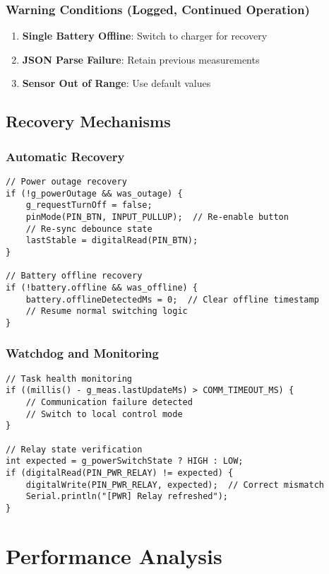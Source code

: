 \documentclass[11pt,a4paper]{article}
\begin{document}
\subsubsection{Warning Conditions (Logged, Continued Operation)}
\begin{enumerate}
    \item \textbf{Single Battery Offline}: Switch to charger for recovery
    \item \textbf{JSON Parse Failure}: Retain previous measurements
    \item \textbf{Sensor Out of Range}: Use default values
\end{enumerate}

\subsection{Recovery Mechanisms}

\subsubsection{Automatic Recovery}
\begin{lstlisting}[caption=Power Outage Recovery]
// Power outage recovery
if (!g_powerOutage && was_outage) {
    g_requestTurnOff = false;
    pinMode(PIN_BTN, INPUT_PULLUP);  // Re-enable button
    // Re-sync debounce state
    lastStable = digitalRead(PIN_BTN);
}

// Battery offline recovery
if (!battery.offline && was_offline) {
    battery.offlineDetectedMs = 0;  // Clear offline timestamp
    // Resume normal switching logic
}
\end{lstlisting}

\subsubsection{Watchdog and Monitoring}
\begin{lstlisting}[caption=Watchdog and Monitoring]
// Task health monitoring
if ((millis() - g_meas.lastUpdateMs) > COMM_TIMEOUT_MS) {
    // Communication failure detected
    // Switch to local control mode
}

// Relay state verification
int expected = g_powerSwitchState ? HIGH : LOW;
if (digitalRead(PIN_PWR_RELAY) != expected) {
    digitalWrite(PIN_PWR_RELAY, expected);  // Correct mismatch
    Serial.println("[PWR] Relay refreshed");
}
\end{lstlisting}

\section{Performance Analysis}
\end{document}
